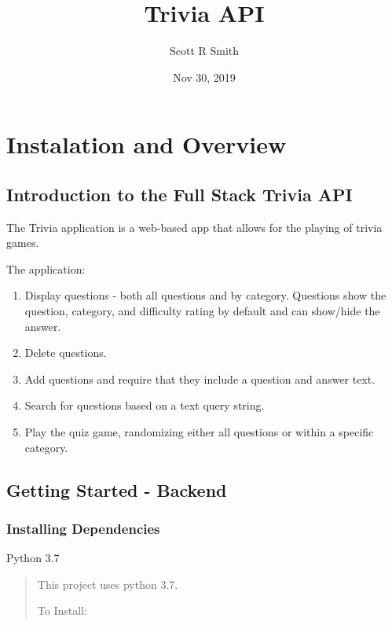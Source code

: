 \documentclass[letterpaper,10pt,english]{sphinxmanual}
\title{Trivia API}
\date{Nov 30, 2019}
\author{Scott R Smith}
\begin{document}
\pagestyle{empty}
\sphinxmaketitle
\pagestyle{plain}
\sphinxtableofcontents
\pagestyle{normal}
\label{\detokenize{index::doc}}



\chapter{Instalation and Overview}
\label{\detokenize{index:instalation-and-overview}}

\section{Introduction to the Full Stack Trivia API}
\label{\detokenize{index:introduction-to-the-full-stack-trivia-api}}
The Trivia application is a web-based app that allows for the playing of trivia games.

The application:
\begin{enumerate}
%
\item {} 
Display questions - both all questions and by category. Questions show the question, category, and difficulty rating by default and can show/hide the answer.

\item {} 
Delete questions.

\item {} 
Add questions and require that they include a question and answer text.

\item {} 
Search for questions based on a text query string.

\item {} 
Play the quiz game, randomizing either all questions or within a specific category.

\end{enumerate}


\section{Getting Started - Backend}
\label{\detokenize{index:getting-started-backend}}

\subsection{Installing Dependencies}
\label{\detokenize{index:installing-dependencies}}
Python 3.7
\begin{quote}

This project uses python 3.7.

To Install: 
\end{quote}
\end{document}
